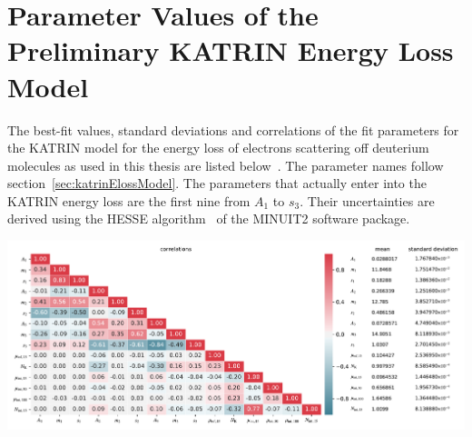 \section{Parameter Values of the Preliminary KATRIN Energy Loss Model}
\label{sec:appendixKatrinElossElossModelParams}
The best-fit values, standard deviations and correlations of the fit parameters for the KATRIN model for the energy loss of electrons scattering off deuterium molecules as used in this thesis are listed below~\cite{Hannen2019_1}. The parameter names follow section~\ref{sec:katrinElossModel}. The parameters that actually enter into the KATRIN energy loss are the first nine from $A_1$ to $s_3$. Their uncertainties are derived using the HESSE algorithm~\cite{James1998} of the MINUIT2 software package.

\includegraphics[width=\textwidth]{chapter/sensitivityStudyWithPreliminaryKatrinElossModel/appendix/fig/katrinElossParamValues.pdf}
\clearpage

